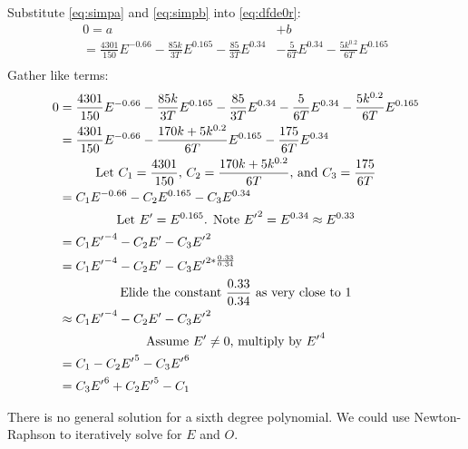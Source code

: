 \documentclass{article}
\begin{document}
Substitute \eqref{eq:simpa} and \eqref{eq:simpb} into \eqref{eq:dfde0r}:
\begin{equation}\label{eq:dfde0r2}
  \begin{split}
    0 = a & + b \\
    = \frac{4301}{150}E^{-0.66} - \frac{85k}{3T}E^{0.165} - \frac{85}{3T}E^{0.34} & - \frac{5}{6T}E^{0.34} - \frac{5k^{0.2}}{6T}E^{0.165} \\
  \end{split}
\end{equation}
Gather like terms:
\begin{equation}\label{eq:dfde0r3}
  \begin{split}
  0 & = \frac{4301}{150}E^{-0.66} - \frac{85k}{3T}E^{0.165} - \frac{85}{3T}E^{0.34} - \frac{5}{6T}E^{0.34} - \frac{5k^{0.2}}{6T}E^{0.165} \\
    & = \frac{4301}{150}E^{-0.66} - \frac{170k + 5k^{0.2}}{6T}E^{0.165} - \frac{175}{6T}E^{0.34} \\
    \span \text{Let $C_1 = \frac{4301}{150}$, $C_2 = \frac{170k + 5k^{0.2}}{6T}$, and $C_3 = \frac{175}{6T}$} \\
    & = C_1E^{-0.66} - C_2E^{0.165} - C_3E^{0.34} \\
    \span \text{Let $E^\prime = E^{0.165}$. Note ${E^\prime}^2 = E^{0.34} \approx E^{0.33}$} \\
    & = C_1{E^\prime}^{-4} - C_2E^\prime - C_3{E^\prime}^2 \\
    & = C_1{E^\prime}^{-4} - C_2E^\prime - C_3{E^\prime}^{2*\frac{0.33}{0.34}} \\
    \span \text{Elide the constant $\frac{0.33}{0.34}$ as very close to $1$} \\
    & \approx C_1{E^\prime}^{-4} - C_2E^\prime - C_3{E^\prime}^2 \\
    \span \text{Assume $E^\prime \ne 0$, multiply by ${E^\prime}^4$} \\
    & = C_1 - C_2{E^\prime}^5 - C_3{E^\prime}^6 \\
    & = C_3{E^\prime}^6 + C_2{E^\prime}^5 - C_1 \\
  \end{split}
\end{equation}

There is no general solution for a sixth degree polynomial. We could use Newton-Raphson to iteratively solve for $E$ and $O$.

\begin{comment}
Substitute $k = \left(\frac{0.2}{0.34}\right)^{1.25}$:
\begin{equation}\label{eq:dfde0r4}
  \begin{split}
  0 & = \frac{4301}{150}E^{-0.66} - \frac{170\left(\frac{0.2}{0.34}\right)^{1.25} + 5\left(\frac{0.2}{0.34}\right)^{0.25}}{6T}E^{0.165} - \frac{175}{6T}E^{0.34} \\
    & = \frac{4301}{150}E^{-0.66} - \frac{170\left(\frac{0.2}{0.34}\right)^{1.25} + 5\left(\frac{0.2}{0.34}\right)^{0.25}}{6T}E^{0.165} - \frac{175}{6T}E^{0.34} \\
  \end{split}
\end{equation}
\end{comment}
\end{document}
